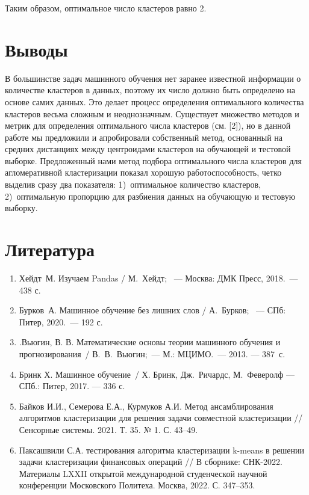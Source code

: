 \documentclass[a4paper,12pt]{article}
\begin{document}
\noindent
Таким образом, оптимальное число кластеров равно 2.

\section{Выводы}

В большинстве задач машинного обучения нет заранее известной информации о количестве кластеров в данных, поэтому их число должно быть определено на основе самих данных. Это делает процесс определения оптимального количества кластеров весьма сложным и неоднозначным. Существует множество методов и метрик для определения оптимального числа кластеров (см. [2]), но в данной работе мы предложили и апробировали собственный метод, основанный на средних дистанциях между центроидами кластеров на обучающей и тестовой выборке. Предложенный нами метод подбора оптимального числа кластеров для агломеративной кластеризации показал хорошую работоспособность, четко выделив сразу два показателя: 1) оптимальное количество кластеров, 2) оптимальную пропорцию для разбиения данных на обучающую и тестовую выборку. 

\section{Литература}

\begin{enumerate}
	\item Хейдт М. Изучаем Pandas / М. Хейдт;  — Москва: ДМК Пресс, 2018. — 438 с.
	\item Бурков А. Машинное обучение без лишних слов / А. Бурков;  — СПб: Питер, 2020. — 192 с.
	\item .Вьюгин, В. В. Математические основы теории машинного обучения и прогнозирования / В. В. Вьюгин; — М.: МЦИМО. — 2013. — 387~с.
	\item Бринк Х. Машинное обучение / Х. Бринк, Дж. Ричардс, М. Феверолф  — СПб.: Питер, 2017. — 336 с.
	\item Байков И.И., Семерова Е.А., Курмуков А.И. Метод ансамблирования алгоритмов кластеризации для решения задачи совместной кластеризации // Сенсорные системы. 2021. Т. 35. № 1. С. 43--49.
	\item Паксашвили С.А. тестирования алгоритма кластеризации k-means в решении задачи кластеризации финансовых операций // В сборнике: СНК-2022. Материалы LXXII открытой международной студенческой научной конференции Московского Политеха. Москва, 2022. С. 347--353.
\end{enumerate}
\end{document}
